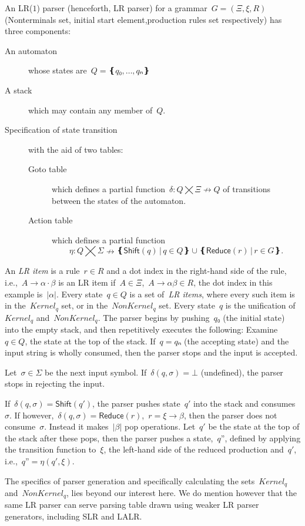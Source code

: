 An LR($1$) parser (henceforth, LR parser) for a grammar~$G=(Ξ,ξ,R)$ (Nonterminals set, initial start element,production rules set respectively)
  has three components:
\begin{description}
  \item[An automaton] whose states are~$Q=❴q₀,…,qₙ❵$
  \item[A stack] which may contain any member of~$Q$.
  \item[Specification of state transition] with the aid of two tables:
  \begin{description}
    \item[Goto table] which defines a partial function~$δ:Q⨉Ξ↛Q$ of transitions
    between the states of the automaton.
    \item[Action table] which
    defines a partial function\[η:Q⨉Σ↛ ❴ \textsf{Shift}(q) \,|\, q∈Q❵ ∪ ❴\textsf{Reduce}(r) \,| \, r∈G❵.\]
  \end{description}
\end{description}
An \emph{LR item} is a rule~$r∈R$ and a dot index in the right-hand side of the rule,
  i.e.,~$A→α·β$ is an LR item if~$A∈Ξ$,~$A→αβ∈R$,
  the dot index in this example is~$|α|$.
Every state~$q∈Q$ is a set of~\emph{LR items},
  where every such item is in the~$Kernel_{q}$ set,
  or in the~$NonKernel_{q}$ set.
Every state~$q$ is the unification of~$Kernel_{q}$ and~$NonKernel_{q}$.
The parser begins by pushing~$q₀$ (the initial state) into the empty stack,
and then repetitively executes the following:
Examine~$q∈Q$, the state at the top of the stack.
If~$q=qₙ$ (the accepting state) and the input string is wholly consumed, then the parser stops and the input is accepted.

Let~$σ∈Σ$ be the next input symbol.
If~$δ(q,σ)=⊥$ (undefined), the parser stops in rejecting the input.

If~$δ(q,σ) = \textsf{Shift}(q')$, the parser pushes state~$q'$
into the stack and consumes~$σ$.
If however,~$δ(q,σ) = \textsf{Reduce}(r)$,~$r=ξ→β$,
then the parser does not consume~$σ$.
Instead it makes~$|β|$ pop operations.
Let~$q'$ be the state at the top of the stack after these pops, then
the parser pushes a state,~$q”$,
defined by applying the transition function to~$ξ$, the left-hand side of the reduced production and~$q'$,
i.e.,~$q”=η(q',ξ)$.

The specifics of parser generation and specifically
  calculating the sets~$Kernel_{q}$ and~$NonKernel_{q}$, lies beyond our interest here.
We do mention however that the same LR parser can serve parsing table drawn using weaker LR parser generators,
including SLR and LALR\@.


